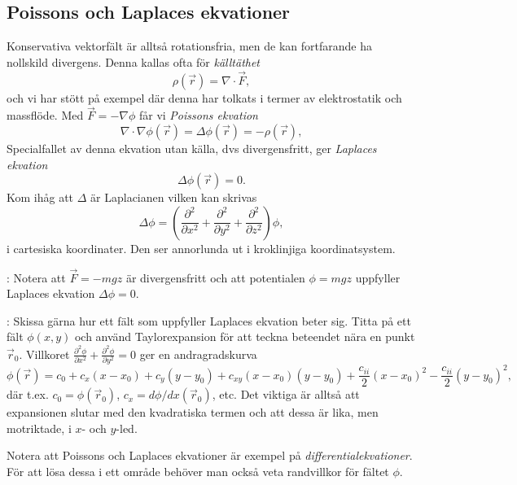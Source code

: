 \documentclass[%
oneside,                 %
final,                   %
10pt]{article}
\newcommand{\longinlinecomment}[3]{{\color{red}{\bf #1}: #2}}
\begin{document}
\subsection{Poissons och Laplaces ekvationer}

Konservativa vektorfält är alltså rotationsfria, men de kan fortfarande ha nollskild divergens. Denna kallas ofta för \emph{källtäthet}
\begin{equation}
\rho(\vec{r}) = \nabla \cdot \vec{F},
\end{equation}
och vi har stött på exempel där denna har tolkats i termer av elektrostatik och massflöde. Med $\vec{F} = -\nabla \phi$ får vi \emph{Poissons ekvation}
\begin{equation}
\nabla \cdot \nabla \phi(\vec{r}) = \Delta \phi(\vec{r}) = -\rho(\vec{r}),
\end{equation}
Specialfallet av denna ekvation utan källa, dvs divergensfritt, ger \emph{Laplaces ekvation}
\begin{equation}
\Delta \phi(\vec{r}) = 0.
\end{equation}
Kom ihåg att $\Delta$ är Laplacianen vilken kan skrivas
\begin{equation}
\Delta \phi = \left( \frac{\partial^2}{\partial x^2} + \frac{\partial^2}{\partial y^2} + \frac{\partial^2}{\partial z^2} \right) \phi,
\end{equation}
i cartesiska koordinater. Den ser annorlunda ut i kroklinjiga koordinatsystem.

\longinlinecomment{Comment 2}{ Notera att $\vec{F} = -m g \hat{z}$ är divergensfritt och att potentialen $\phi = m g z$ uppfyller Laplaces ekvation $\Delta \phi = 0$. }{ Notera att $\vec{F} = }

\longinlinecomment{Rita 3}{ Skissa gärna hur ett fält som uppfyller Laplaces ekvation beter sig. Titta på ett fält $\phi(x,y)$ och använd Taylorexpansion för att teckna beteendet nära en punkt $\vec{r}_0$. Villkoret $\frac{\partial^2\phi}{\partial x^2} + \frac{\partial^2\phi}{\partial y^2} = 0$ ger en andragradskurva  $$ \phi(\vec{r}) =  c_0 + c_x (x-x_0) + c_y (y-y_0) + c_{xy} (x-x_0)(y-y_0)+ \frac{c_{ii}}{2}(x-x_0)^2 - \frac{c_{ii}}{2}(y-y_0)^2, $$ där t.ex. $c_0 = \phi(\vec{r}_0)$, $c_x = d\phi/dx(\vec{r}_0)$, etc. Det viktiga är alltså att expansionen slutar med den kvadratiska termen och att dessa är lika, men motriktade, i $x$- och $y$-led. }{ Skissa gärna hur ett }

Notera att Poissons och Laplaces ekvationer är exempel på \emph{differentialekvationer}. För att lösa dessa i ett område behöver man också veta randvillkor för fältet $\phi$. 
\end{document}
